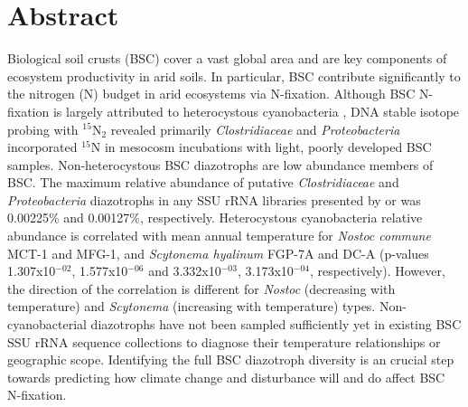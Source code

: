 \section{Abstract}
Biological soil crusts (BSC) cover a vast global area and are key components
of ecosystem productivity in arid soils. In particular, BSC contribute
significantly to the nitrogen (N) budget in arid ecosystems via N-fixation.
Although BSC N-fixation is largely attributed to heterocystous cyanobacteria
\citep{Yeager, 14766579, Yeager_2012}, DNA stable isotope probing with
$^{15}$N$_{2}$ revealed primarily \textit{Clostridiaceae} and
\textit{Proteobacteria} incorporated $^{15}$N in mesocosm incubations with
light, poorly developed BSC samples. Non-heterocystous BSC diazotrophs are
low abundance members of BSC. The maximum relative abundance of putative
\textit{Clostridiaceae} and \textit{Proteobacteria} diazotrophs in any SSU
rRNA libraries presented by \citet{Garcia_Pichel_2013} or \citet{Steven_2013}
was 0.00225\% and 0.00127\%, respectively. Heterocystous cyanobacteria
relative abundance is correlated with mean annual temperature for
\textit{Nostoc commune} MCT-1 and MFG-1, and \textit{Scytonema hyalinum}
FGP-7A and DC-A (p-values 1.307x10$^{-02}$, 1.577x10$^{-06}$ and
3.332x10$^{-03}$, 3.173x10$^{-04}$, respectively). However, the direction of
the correlation is different for \textit{Nostoc} (decreasing with
temperature) and \textit{Scytonema} (increasing with temperature) types.
Non-cyanobacterial diazotrophs have not been sampled sufficiently yet in
existing BSC SSU rRNA sequence collections to diagnose their temperature
relationships or geographic scope. Identifying the full BSC diazotroph
diversity is an crucial step towards predicting how climate change and
disturbance will and do affect BSC N-fixation.
